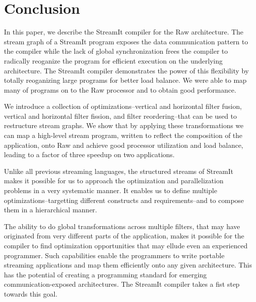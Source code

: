 \section{Conclusion}
\label{sec:conclusion}

In this paper, we describe the StreamIt compiler for the Raw
architecture.  The stream graph of a StreamIt program exposes the data
communication pattern to the compiler while the lack of global
synchronization frees the compiler to radically reoganize the program
for efficient execution on the underlying architecture. The StreamIt
compiler demonstrates the power of this flexibility by totally
reoganizing large programs for better load balance. We were able to
map many of programs on to the Raw processor and to obtain good
performance.

We introduce a collection of optimizations--vertical and horizontal
filter fusion, vertical and horizontal filter fission, and filter
reordering--that can be used to restructure stream graphs.  We show
that by applying these transformations we can map a high-level stream
program, written to reflect the composition of the application, onto
Raw and achieve good processor utilization and load balance, leading
to a factor of three speedup on two applications.

Unlike all previous streaming languages, the structured streams of
StreamIt makes it possible for us to approach the optimization and
parallelization problems in a very systematic manner. It enables us to
define multiple optimizations--targetting different constructs and
requirements--and to compose them in a hierarchical manner.

The ability to do global transformations across multiple filters, that
may have originated from very different parts of the application,
makes it possible for the compiler to find optimization opportunities
that may ellude even an experienced programmer.  Such capabilities
enable the programmers to write portable streaming applications and
map them efficiently onto any given architecture. This has the
potential of creating a programming standard for emerging
communication-exposed architectures.  The StreamIt compiler takes a
fist step towards this goal.

